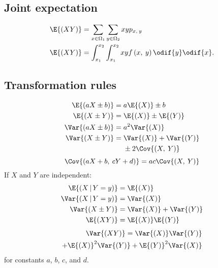 \documentclass{article}
\begin{document}
\begin{multicols}{3}
    \subsection{Joint expectation}
    \begin{align*}
        \E{\left( XY \right)} & = \sum_{x\in\Omega_1} \sum_{y\in\Omega_2} xy p_{x,\: y}                          \\
        \E{\left( XY \right)} & = \int_{x_1}^{x_2} \int_{x_1}^{x_2} xy f\left( x,\: y \right) \odif{y} \odif{x}.
    \end{align*}
    \subsection{Transformation rules}
    \begin{align*}
        \E{\left( aX \pm b \right)}   & = a\E{\left( X \right)} \pm b                        \\
        \E{\left( X \pm Y \right)}    & = \E{\left( X \right)} \pm \E{\left( Y \right)}      \\
        \Var{\left( aX \pm b \right)} & = a^2\Var{\left( X \right)}                          \\
        \Var{\left( X \pm Y \right)}  & = \begin{aligned}[t]
                                               & \Var{\left( X \right)} + \Var{\left( Y \right)} \\
                                               & \pm 2\Cov{\left( X,\: Y \right)}
                                          \end{aligned}
    \end{align*}
    \begin{equation*}
        \Cov{\left( aX + b,\: cY + d \right)} = ac \Cov{\left( X,\: Y \right)}
    \end{equation*}
    If \(X\) and \(Y\) are independent:
    \begingroup
    \allowdisplaybreaks
    \begin{align*}
        \E{\left( X \,\vert\, Y = y \right)}   & = \E{\left( X \right)}                            \\
        \Var{\left( X \,\vert\, Y = y \right)} & = \Var{\left( X \right)}                          \\
        \Var{\left( X \pm Y \right)}           & = \Var{\left( X \right)} + \Var{\left( Y \right)} \\
        \E{\left( XY \right)}                  & = \E{\left( X \right)} \E{\left( Y \right)}
    \end{align*}
    \endgroup
    \begin{align*}
        \Var{\left( XY \right)}      = \Var{\left( X \right)} \Var{\left( Y \right)} \\
        + \E{\left( X \right)}^2 \Var{\left( Y \right)} + \E{\left( Y \right)}^2 \Var{\left( X \right)}
    \end{align*}
    for constants \(a\), \(b\), \(c\), and \(d\).

\end{multicols}
\end{document}
